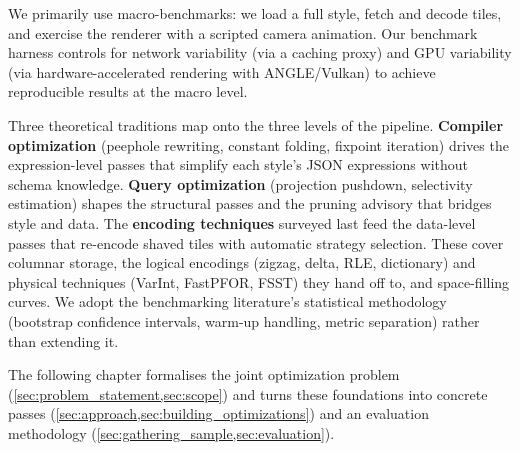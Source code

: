 \noindent We primarily use macro-benchmarks: we load a full style, fetch and decode tiles, and exercise the renderer with a scripted camera animation.
Our benchmark harness controls for network variability (via a caching proxy) and \ac{GPU} variability (via hardware-accelerated rendering with ANGLE/Vulkan) to achieve reproducible results at the macro level.

\begin{chaptersummary}
Three theoretical traditions map onto the three levels of the pipeline.
\textbf{Compiler optimization} (peephole rewriting, constant folding, fixpoint iteration) drives the expression-level passes that simplify each style's \ac{JSON} expressions without schema knowledge.
\textbf{Query optimization} (projection pushdown, selectivity estimation) shapes the structural passes and the pruning advisory that bridges style and data.
The \textbf{encoding techniques} surveyed last feed the data-level passes that re-encode shaved tiles with automatic strategy selection.
These cover columnar storage, the logical encodings (zigzag, delta, \ac{RLE}, dictionary) and physical techniques (VarInt, FastPFOR, \ac{FSST}) they hand off to, and space-filling curves.
We adopt the benchmarking literature's statistical methodology (bootstrap confidence intervals, warm-up handling, metric separation) rather than extending it.

The following chapter formalises the joint optimization problem (\cref{sec:problem_statement,sec:scope}) and turns these foundations into concrete passes (\cref{sec:approach,sec:building_optimizations}) and an evaluation methodology (\cref{sec:gathering_sample,sec:evaluation}).
\end{chaptersummary}
